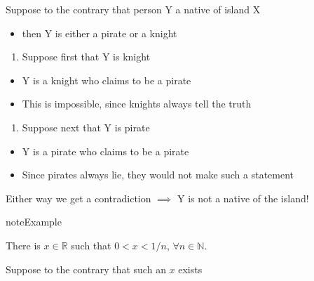 \documentclass[letterpaper,10pt,english]{jupyterBook}
\begin{document}
\sphinxAtStartPar
{}
Suppose to the contrary that person Y  a native of island X
\begin{itemize}
\item {} 
\sphinxAtStartPar
then Y is either a pirate or a knight

\end{itemize}
\begin{enumerate}
%
\item {} 
\sphinxAtStartPar
Suppose first that Y is knight

\end{enumerate}
\begin{itemize}
\item {} 
\sphinxAtStartPar
Y is a knight who claims to be a pirate

\item {} 
\sphinxAtStartPar
This is impossible, since knights always tell the truth

\end{itemize}
\begin{enumerate}
%
\setcounter{enumi}{1}
\item {} 
\sphinxAtStartPar
Suppose next that Y is pirate

\end{enumerate}
\begin{itemize}
\item {} 
\sphinxAtStartPar
Y is a pirate who claims to be a pirate

\item {} 
\sphinxAtStartPar
Since pirates always lie, they would not make such a statement

\end{itemize}

\sphinxAtStartPar
Either way we get a contradiction \(\implies\) Y is not a native of the island!

\begin{sphinxadmonition}{note}{Example}

\sphinxAtStartPar
There is  \(x \in \mathbb{R}\) such that \(0 < x < 1/n\), \(\forall n \in \mathbb{N}\).
\end{sphinxadmonition}

\sphinxAtStartPar
{} Suppose to the contrary that such an \(x\) exists

\begin{figure}[htbp]
\centering

\noindent{}
\end{figure}
\end{document}
